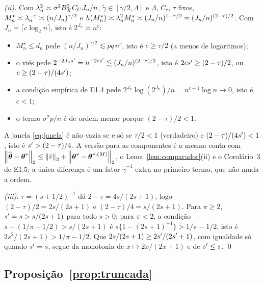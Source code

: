 \documentclass[11pt,a4paper]{article}
\newcommand{\gtil}{\widetilde{\gamma}}
\newcommand{\Mstar}{M^{\star}}
\newcommand{\thstarM}[1]{\btheta^{*,(#1)}}
\begin{document}
\emph{(ii).} Com $\lambda_{n}^{2} \asymp \sigma^{2}B_{X}^{2}C_{U}J_{n}/n$,
$\gtil \in [\gamma/2, \Lambda]$ e $\Lambda$, $C_{\tau}$, $\tau$ fixos,
$\Mstar_{n} \asymp \pen_{n}^{-\tau} \asymp (n/J_{n})^{\tau/2}$ e
$h(\Mstar_{n}) \asymp \pen_{n}^{2}\Mstar_{n} \asymp
(J_{n}/n)^{1-\tau/2} = (J_{n}/n)^{(2-\tau)/2}$. Com
$J_{n} = \lceil c\log_{2}n\rceil$, isto é $2^{J_{n}} \asymp n^{c}$:
\begin{itemize}[nosep, leftmargin=*]
  \item $\Mstar_{n} \le d_{n}$ pede $(n/J_{n})^{\tau/2} \lesssim pq\,n^{c}$,
    isto é $c \ge \tau/2$ (a menos de logaritmos);
  \item o viés pede $2^{-2J_{n}s'} = n^{-2cs'} \lesssim
    (J_{n}/n)^{(2-\tau)/2}$, isto é $2cs' \ge (2-\tau)/2$, ou
    $c \ge (2-\tau)/(4s')$;
  \item a condição empírica de E1.4 pede $2^{J_{n}}\log(2^{J_{n}})/n =
    n^{c-1}\log n \to 0$, isto é $c < 1$;
  \item o termo $\sigma^{2}p/n$ é de ordem menor porque $(2-\tau)/2 < 1$.
\end{itemize}
A janela \eqref{eq:janela} é não vazia se e só se $\tau/2 < 1$ (verdadeiro) e
$(2-\tau)/(4s') < 1$, isto é $s' > (2-\tau)/4$. A versão para as
componentes é a mesma conta com
$\norm{\thetahat-\thetastar}_{2} \le \norm{\bar v}_{2} +
\norm{\thetastar-\thstarM{M}}_{2}$, o Lema~\ref{lem:comparador}(ii) e o
Corolário~3 de E1.5; a única diferença é um fator $\gtil^{-1}$ extra no
primeiro termo, que não muda a ordem.

\emph{(iii).} $\tau = (s+1/2)^{-1}$ dá $2-\tau = 4s/(2s+1)$, logo
$(2-\tau)/2 = 2s/(2s+1)$ e $(2-\tau)/4 = s/(2s+1)$. Para $\pi \ge 2$,
$s' = s > s/(2s+1)$ para todo $s > 0$; para $\pi < 2$, a condição
$s - (1/\pi-1/2) > s/(2s+1)$ é $s\{1 - (2s+1)^{-1}\} > 1/\pi - 1/2$, isto é
$2s^{2}/(2s+1) > 1/\pi - 1/2$. Que $2s/(2s+1) \ge 2s'/(2s'+1)$, com
igualdade só quando $s' = s$, segue da monotonia de $x \mapsto 2x/(2x+1)$
e de $s' \le s$. \qed

\subsection*{Proposição~\ref{prop:truncada}}
\end{document}
